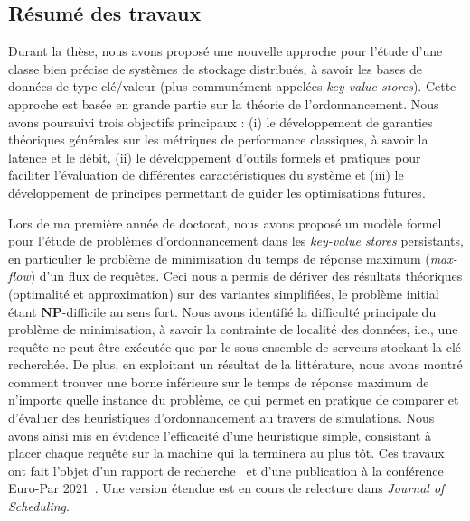 \documentclass[12pt]{article}
\begin{document}
\subsection{Résumé des travaux}

Durant la thèse, nous avons proposé une nouvelle approche pour l'étude d'une classe bien précise de
systèmes de stockage distribués, à savoir les bases de données de type clé/valeur (plus communément
appelées \emph{key-value stores}).  
Cette approche est basée en grande partie sur la théorie de l'ordonnancement.  
Nous avons poursuivi trois objectifs principaux : (i) le développement de garanties théoriques
générales sur les métriques de performance classiques, à savoir la latence et le débit, (ii) le
développement d'outils formels et pratiques pour faciliter l'évaluation de différentes
caractéristiques du système et (iii) le développement de principes permettant de guider les
optimisations futures.

Lors de ma première année de doctorat, nous avons proposé un modèle formel pour l'étude de problèmes
d'ordonnancement dans les \emph{key-value stores} persistants, en particulier le problème de
minimisation du temps de réponse maximum (\emph{max-flow}) d'un flux de requêtes.  
Ceci nous a permis de dériver des résultats théoriques (optimalité et approximation) sur des
variantes simplifiées, le problème initial étant \(\mathbf{NP}\)-difficile au sens fort.  
Nous avons identifié la difficulté principale du problème de minimisation, à savoir la contrainte de
localité des données, i.e., une requête ne peut être exécutée que par le sous-ensemble de serveurs
stockant la clé recherchée.  
De plus, en exploitant un résultat de la littérature, nous avons montré comment trouver une borne
inférieure sur le temps de réponse maximum de n'importe quelle instance du problème, ce qui permet
en pratique de comparer et d'évaluer des heuristiques d'ordonnancement au travers de simulations.  
Nous avons ainsi mis en évidence l'efficacité d'une heuristique simple, consistant à placer chaque
requête sur la machine qui la terminera au plus tôt.  
Ces travaux ont fait l'objet d'un rapport de recherche~\cite{benmokhtar2021-rr} et d'une publication
à la conférence Euro-Par 2021~\cite{benmokhtar2021}.  
Une version étendue est en cours de relecture dans \emph{Journal of Scheduling}.
\end{document}
